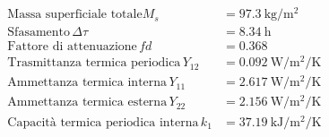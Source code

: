 \begin{flushleft}
\begin{align*}
\text{Massa superficiale totale} M_s \, &= \SI{97.3}{\kilo\gram\per\metre\squared}\\
\text{Sfasamento} \, \Delta\tau &= \SI{8.34}{\hour}\\
\text{Fattore di attenuazione} \, fd &= \SI{0.368}{}\\
\text{Trasmittanza termica periodica} \, Y_{12} &= \SI{0.092}{\watt\per\metre\squared\per\kelvin}\\
\text{Ammettanza termica interna} \, Y_{11} &= \SI{2.617}{\watt\per\metre\squared\per\kelvin}\\
\text{Ammettanza termica esterna} \, Y_{22} &= \SI{2.156}{\watt\per\metre\squared\per\kelvin}\\
\text{Capacità termica periodica interna} \, k_1 &= \SI{37.19}{\kilo\joule\per\metre\squared\per\kelvin}\
\end{align*}
\end{flushleft}
